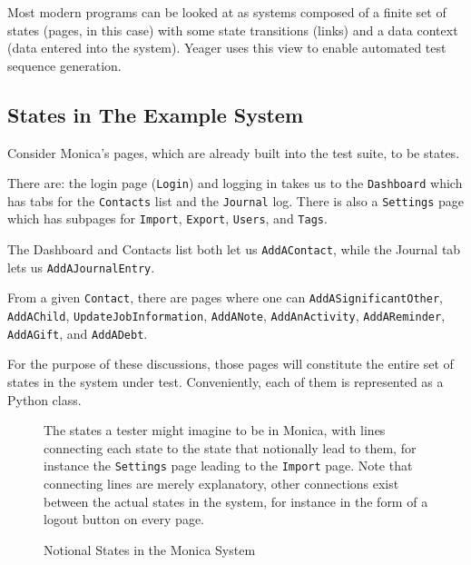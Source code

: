 Most modern programs can be looked at as systems composed of a finite set of states (pages, in this case) with some state transitions (links) and a data context (data entered into the system). Yeager uses this view to enable automated test sequence generation.

\subsection{States in The Example System}
Consider Monica's pages, which are already built into the test suite, to be states.

There are: the login page (\texttt{Login}) and logging in takes us to the \texttt{Dashboard} which has tabs for the \texttt{Contacts} list and the \texttt{Journal} log. There is also a \texttt{Settings} page which has subpages for \texttt{Import}, \texttt{Export}, \texttt{Users}, and \texttt{Tags}.

The Dashboard and Contacts list both let us \texttt{AddAContact}, while the Journal tab lets us \texttt{AddAJournalEntry}.

From a given \texttt{Contact}, there are pages where one can \texttt{AddASignificantOther}, \texttt{AddAChild}, \texttt{UpdateJobInformation}, \texttt{AddANote}, \texttt{AddAnActivity}, \texttt{AddAReminder}, \texttt{AddAGift}, and \texttt{AddADebt}.

For the purpose of these discussions, those pages will constitute the entire set of states in the system under test. Conveniently, each of them is represented as a Python class.

\begin{figure}
\noindent{}
\caption{Notional States in the Monica System}
The states a tester might imagine to be in Monica, with lines connecting each state to the state that notionally lead to them, for instance the \texttt{Settings} page leading to the \texttt{Import} page. Note that connecting lines are merely explanatory, other connections exist between the actual states in the system, for instance in the form of a logout button on every page.
\end{figure}

